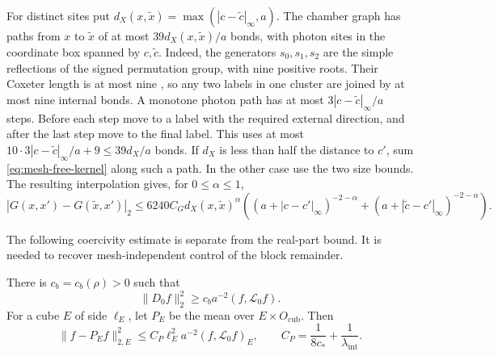 For distinct sites put
$d_X(x,\widetilde x)=\max(|c-\widetilde c|_\infty,a)$.
The chamber graph has paths from $x$ to $\widetilde x$ of at most
$39d_X(x,\widetilde x)/a$ bonds, with photon sites in the coordinate
box spanned by $c,\widetilde c$. Indeed, the generators
$s_0,s_1,s_2$ are the simple reflections of the signed permutation
group, with nine positive roots. Their Coxeter length is at most nine
\cite[Theorem~22.14]{EtingofLieNotes}, so any two labels in one
cluster are joined by at most nine internal bonds. A monotone photon
path has at most $3|c-\widetilde c|_\infty/a$ steps. Before each step
move to a label with the required external direction, and after the
last step move to the final label. This uses at most
$10\cdot3|c-\widetilde c|_\infty/a+9\le39d_X/a$ bonds.
If $d_X$ is less than half the distance to $c'$, sum
\eqref{eq:mesh-free-kernel} along such a path. In the other case use
the two size bounds. The resulting interpolation gives, for
$0\le\alpha\le1$,
\begin{equation}\label{eq:free-holder-kernel}
 |G(x,x')-G(\widetilde x,x')|_2
 \le6240C_G d_X(x,\widetilde x)^\alpha
 \left((a+|c-c'|_\infty)^{-2-\alpha}
       +(a+|\widetilde c-c'|_\infty)^{-2-\alpha}\right).
\end{equation}

The following coercivity estimate is separate from the real-part bound.
It is needed to recover mesh-independent control of the block remainder.

\begin{proposition}\label{prop:free-coercivity}
There is $c_b=c_b(\rho)>0$ such that
\begin{equation}\label{eq:free-coercivity}
 \|D_0f\|_2^2\ge c_ba^{-2}(f,\mathcal L_0f).
\end{equation}
For a cube $E$ of side $\ell_E$, let $P_E$ be the mean over
$E\times O_{\mathrm{cub}}$. Then
\begin{equation}\label{eq:chamber-poincare}
 \|f-P_Ef\|_{2,E}^2\le C_P\ell_E^2a^{-2}(f,\mathcal L_0f)_E,
 \qquad C_P=\frac1{8c_*}+\frac1{\lambda_{\mathrm{int}}}.
\end{equation}
\end{proposition}

